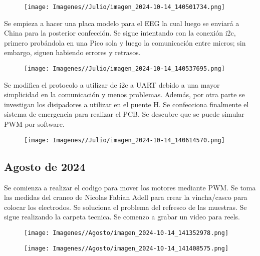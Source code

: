\documentclass{article}
\begin{document}
\begin{figure}[H]
    \centering
    \texttt{[image: Imagenes//Julio/imagen\_2024-10-14\_140501734.png]}
\end{figure}

\newpage
Se empieza a hacer una placa modelo para el EEG la cual luego se enviará a China para la posterior confección. Se sigue intentando con la conexión i2c, primero probándola en una Pico sola y luego la comunicación entre micros; sin embargo, siguen habiendo errores y retrasos.

\begin{figure}[H]
    \centering
    \texttt{[image: Imagenes//Julio/imagen\_2024-10-14\_140537695.png]}
\end{figure}

Se modifica el protocolo a utilizar de i2c a UART debido a una mayor simplicidad en la comunicación y menos problemas. Además, por otra parte se investigan los disipadores a utilizar en el puente H. Se confecciona finalmente el sistema de emergencia para realizar el PCB. Se descubre que se puede simular PWM por software.

\begin{figure}[H]
    \centering
    \texttt{[image: Imagenes//Julio/imagen\_2024-10-14\_140614570.png]}
\end{figure}

\newpage

\begin{center}
    \section{Agosto de 2024}
\end{center}

Se comienza a realizar el codigo para mover los motores mediante PWM. Se toma las medidas del craneo de Nicolas Fabian Adell para crear la vincha/casco para colocar los electrodos. Se soluciona el problema del refresco de las muestras. Se sigue realizando la carpeta tecnica. Se comenzo a grabar un video para reels. 

\begin{figure}[H]
    \centering
    \texttt{[image: Imagenes//Agosto/imagen\_2024-10-14\_141352978.png]}
\end{figure}

\begin{figure}[H]
    \centering
    \texttt{[image: Imagenes//Agosto/imagen\_2024-10-14\_141408575.png]}
\end{figure}
\end{document}
